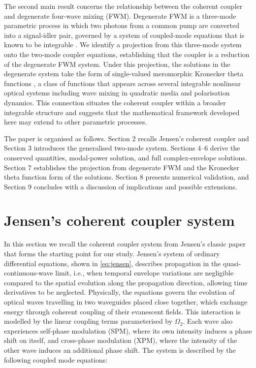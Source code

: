 \documentclass[11pt,a4paper]{article}
\numberwithin{equation}{section}
\begin{document}
The second main result concerns the relationship between the coherent coupler and degenerate four-wave mixing (FWM). 
Degenerate FWM is a three-mode parametric process in which two photons from a common pump are converted into a signal-idler pair, governed by a system of coupled-mode equations that is known to be integrable \cite{agrawalNonlinearFiberOptics2019, heskethCompleteWeierstrassElliptic2026}. 
We identify a projection from this three-mode system onto the two-mode coupler equations, establishing that the coupler is a reduction of the degenerate FWM system. 
Under this projection, the solutions in the degenerate system take the form of single-valued meromorphic Kronecker theta functions \cite{heskethGeneralComplexEnvelope2015}, a class of functions that appears across several integrable nonlinear optical systems including wave mixing in quadratic media and polarisation dynamics. 
This connection situates the coherent coupler within a broader integrable structure and suggests that the mathematical framework developed here may extend to other parametric processes.

The paper is organised as follows. 
Section 2 recalls Jensen's coherent coupler and Section 3 introduces the generalised two-mode system. 
Sections 4--6 derive the conserved quantities, modal-power solution, and full complex-envelope solutions. 
Section 7 establishes the projection from degenerate FWM and the Kronecker theta function form of the solutions. 
Section 8 presents numerical validation, and Section 9 concludes with a discussion of implications and possible extensions.


\section{Jensen's coherent coupler system}
In this section we recall the coherent coupler system from Jensen's classic paper \cite{jensenNonlinearCoherentCoupler1982} that forms the starting point for our study. 
Jensen's system of ordinary differential equations, shown in \eqref{eq:jensen}, describes propagation in the quasi-continuous-wave limit, i.e., when temporal envelope variations are negligible compared to the spatial evolution along the propagation direction, allowing time derivatives to be neglected.
Physically, the equations govern the evolution of optical waves travelling in two waveguides placed close together, which exchange energy through coherent coupling of their evanescent fields.
This interaction is modelled by the linear coupling terms parameterised by $\Omega_2$.
Each wave also experiences self-phase modulation (SPM), where its own intensity induces a phase shift on itself, and cross-phase modulation (XPM), where the intensity of the other wave induces an additional phase shift. 
The system is described by the following coupled mode equations:
\end{document}
